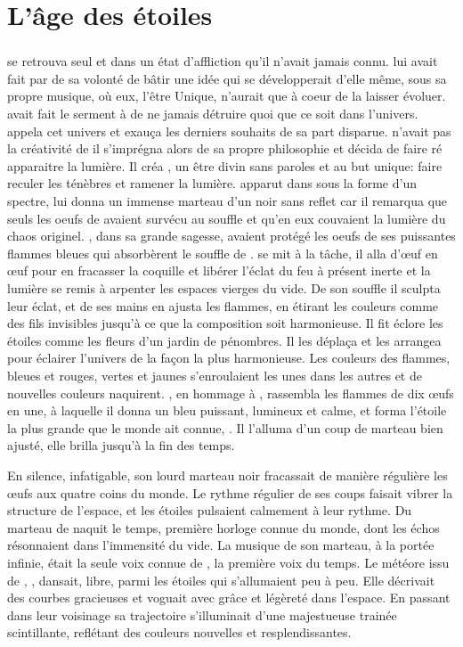\chapter{L'âge des étoiles}

\subsection{\Cind}

\Cind se retrouva seul et dans un état d'affliction qu'il n'avait jamais connu. \Mey lui avait fait par de sa volonté de bâtir une idée qui se développerait d'elle même, sous sa propre musique, où eux, l'être Unique, n'aurait que à coeur de la laisser évoluer. \Cind avait fait le serment à \Mey de ne jamais détruire quoi que ce soit dans l'univers. \Cind appela cet univers \Dreyma et exauça les derniers souhaits de sa part disparue. \Cind n'avait pas la créativité de \Mey il s'imprégna alors de sa propre philosophie et décida de faire ré apparaitre la lumière. Il créa \Carac, un être divin sans paroles et au but unique: faire reculer les ténèbres et ramener la lumière. \Carac apparut dans \Dreyma sous la forme d'un spectre, \Cind lui donna un immense marteau d'un noir sans reflet car il remarqua que seuls les oeufs de \Tot avaient survécu au souffle et qu'en eux couvaient la lumière du chaos originel. \Boromu, dans sa grande sagesse, avaient protégé les oeufs de ses puissantes flammes bleues qui absorbèrent le souffle de \Cind.  \Carac se mit à la tâche, il alla d'œuf en œuf pour en fracasser la coquille et libérer l'éclat du feu à présent inerte et la lumière se remis à arpenter les espaces vierges du vide. De son souffle il sculpta leur éclat, et de ses mains en ajusta les flammes, en étirant les couleurs comme des fils invisibles jusqu'à ce que la composition soit harmonieuse. Il fit éclore les étoiles comme les fleurs d'un jardin de pénombres. Il les déplaça et les arrangea pour éclairer l'univers de la façon la plus harmonieuse. Les couleurs des flammes, bleues et rouges, vertes et jaunes s'enroulaient les unes dans les autres et de nouvelles couleurs naquirent. \Carac, en hommage à \Boromu, rassembla les flammes de dix œufs en une, à laquelle il donna un bleu puissant, lumineux et calme, et forma l'étoile la plus grande que le monde ait connue, \Boromil. Il l'alluma d'un coup de marteau bien ajusté, elle brilla jusqu'à la fin des temps. 

En silence, infatigable, son lourd marteau noir fracassait de manière régulière les œufs aux quatre coins du monde. Le rythme régulier de ses coups faisait vibrer la structure de l'espace, et les étoiles pulsaient calmement à leur rythme. Du marteau de \Carac naquit le temps, première horloge connue du monde, dont les échos résonnaient dans l'immensité du vide. La musique de son marteau, à la portée infinie, était la seule voix connue de \Carac, la première voix du temps. Le météore issu de \Mey, \Drisst, dansait, libre, parmi les étoiles qui s'allumaient peu à peu. Elle décrivait des courbes gracieuses et voguait avec grâce et légèreté dans l'espace. En passant dans leur voisinage sa trajectoire s'illuminait d'une majestueuse trainée scintillante, reflétant des couleurs nouvelles et resplendissantes.


